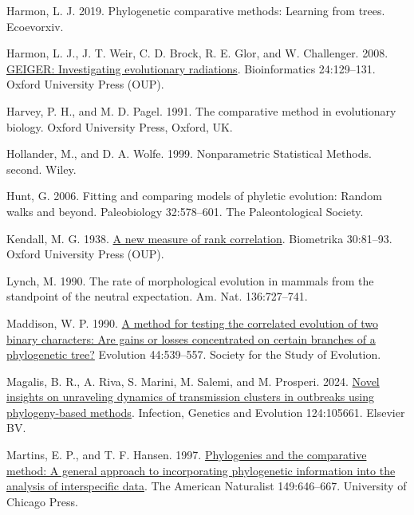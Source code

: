 \documentclass[fleqn,10pt,lineno]{wlpeerj} %
\newlength{\cslhangindent}
\newenvironment{CSLReferences}[2] %
 {\begin{list}{}{%
  \setlength{\itemindent}{0pt}
  \setlength{\leftmargin}{0pt}
  \setlength{\parsep}{0pt}
  \ifodd #1
   \setlength{\leftmargin}{\cslhangindent}
   \setlength{\itemindent}{-1\cslhangindent}
  \fi
  \setlength{\itemsep}{#2\baselineskip}}}
 {\end{list}}
\begin{document}
\begin{CSLReferences}{1}{0}
Harmon, L. J. 2019. Phylogenetic comparative methods: Learning from trees. Ecoevorxiv.

Harmon, L. J., J. T. Weir, C. D. Brock, R. E. Glor, and W. Challenger. 2008. \href{https://doi.org/10.1093/bioinformatics/btm538}{GEIGER: Investigating evolutionary radiations}. Bioinformatics 24:129--131. Oxford University Press (OUP).

Harvey, P. H., and M. D. Pagel. 1991. The comparative method in evolutionary biology. Oxford University Press, Oxford, UK.

Hollander, M., and D. A. Wolfe. 1999. Nonparametric {Statistical Methods}. second. {Wiley}.

Hunt, G. 2006. Fitting and comparing models of phyletic evolution: Random walks and beyond. Paleobiology 32:578--601. The Paleontological Society.

Kendall, M. G. 1938. \href{https://doi.org/10.1093/biomet/30.1-2.81}{A new measure of rank correlation}. Biometrika 30:81--93. Oxford University Press (OUP).

Lynch, M. 1990. The rate of morphological evolution in mammals from the standpoint of the neutral expectation. Am. Nat. 136:727--741.

Maddison, W. P. 1990. \href{https://doi.org/10.2307/2409435}{A method for testing the correlated evolution of two binary characters: Are gains or losses concentrated on certain branches of a phylogenetic tree?} Evolution 44:539--557. Society for the Study of Evolution.

Magalis, B. R., A. Riva, S. Marini, M. Salemi, and M. Prosperi. 2024. \href{https://doi.org/10.1016/j.meegid.2024.105661}{Novel insights on unraveling dynamics of transmission clusters in outbreaks using phylogeny-based methods}. Infection, Genetics and Evolution 124:105661. Elsevier BV.

Martins, E. P., and T. F. Hansen. 1997. \href{https://doi.org/10.1086/286013}{Phylogenies and the comparative method: A general approach to incorporating phylogenetic information into the analysis of interspecific data}. The American Naturalist 149:646--667. University of Chicago Press.


\end{CSLReferences}
\end{document}
